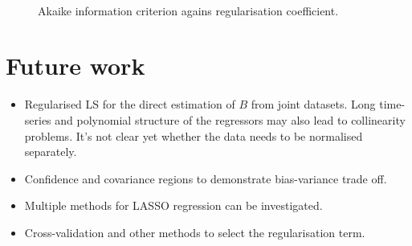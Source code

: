 \documentclass[a4paper,11pt,twoside]{article}
\theoremstyle{mytheoremstyle}
\begin{document}
\begin{figure}[!t]
	\centering
	\\
	\caption{Akaike information criterion agains regularisation coefficient.}\label{fig:Callout}
\end{figure}
\section{Future work}
\begin{itemize}
	\item Regularised LS for the direct estimation of $B$ from joint datasets. Long time-series and polynomial structure of the regressors may also lead to collinearity problems. It's not clear yet whether the data needs to be normalised separately.
	\item Confidence and covariance regions to demonstrate bias-variance trade off.
	\item Multiple methods for LASSO regression can be investigated.
	\item Cross-validation and other methods to select the regularisation term.
\end{itemize}
\printbibliography
\end{document}
